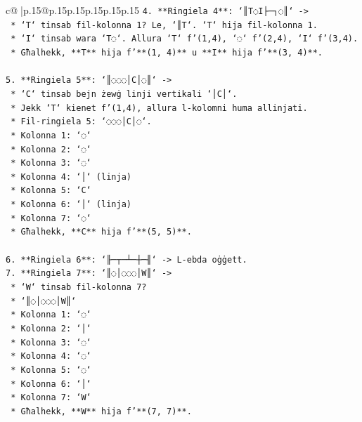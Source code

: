 \documentclass{article}
\begin{document}
{\begin{supertabular}{c@{$\;$}|p{.15\linewidth}@{}p{.15\linewidth}p{.15\linewidth}p{.15\linewidth}p{.15\linewidth}p{.15\linewidth}}
{{{\texttt{4.  **Ringiela 4**: `║T◌I├─┐◌║` {-}>} \\
\texttt{    *   `T` tinsab fil{-}kolonna 1? Le, `║T`. `T` hija fil{-}kolonna 1.} \\
\texttt{    *   `I` tinsab wara `T◌`. Allura `T` f'(1,4), `◌` f'(2,4), `I` f'(3,4).} \\
\texttt{    *   Għalhekk, **T** hija f'**(1, 4)** u **I** hija f'**(3, 4)**.} \\
\\ 
\texttt{5.  **Ringiela 5**: `║◌◌◌│C│◌║` {-}>} \\
\texttt{    *   `C` tinsab bejn żewġ linji vertikali `│C│`.} \\
\texttt{    *   Jekk `T` kienet f'(1,4), allura l{-}kolomni huma allinjati.} \\
\texttt{    *   Fil{-}ringiela 5: `◌◌◌│C│◌`.} \\
\texttt{    *   Kolonna 1: `◌`} \\
\texttt{    *   Kolonna 2: `◌`} \\
\texttt{    *   Kolonna 3: `◌`} \\
\texttt{    *   Kolonna 4: `│` (linja)} \\
\texttt{    *   Kolonna 5: `C`} \\
\texttt{    *   Kolonna 6: `│` (linja)} \\
\texttt{    *   Kolonna 7: `◌`} \\
\texttt{    *   Għalhekk, **C** hija f'**(5, 5)**.} \\
\\ 
\texttt{6.  **Ringiela 6**: `╟─┬─┴─┼─╢` {-}> L{-}ebda oġġett.} \\
\texttt{7.  **Ringiela 7**: `║◌│◌◌◌│W║` {-}>} \\
\texttt{    *   `W` tinsab fil{-}kolonna 7?} \\
\texttt{    *   `║◌│◌◌◌│W║`} \\
\texttt{    *   Kolonna 1: `◌`} \\
\texttt{    *   Kolonna 2: `│`} \\
\texttt{    *   Kolonna 3: `◌`} \\
\texttt{    *   Kolonna 4: `◌`} \\
\texttt{    *   Kolonna 5: `◌`} \\
\texttt{    *   Kolonna 6: `│`} \\
\texttt{    *   Kolonna 7: `W`} \\
\texttt{    *   Għalhekk, **W** hija f'**(7, 7)**.} \\
\\ 
}}}
\end{supertabular}}
\end{document}
